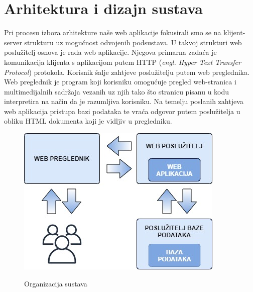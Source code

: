 \chapter{Arhitektura i dizajn sustava}
		

	\textnormal{Pri procesu izbora arhitekture naše web aplikacije fokusirali smo se na klijent-server strukturu uz mogućnost odvojenih podsustava. U takvoj strukturi web poslužitelj osnova je rada web aplikacije. Njegova primarna zadaća je komunikacija klijenta s aplikacijom putem HTTP (\textit{engl. Hyper Text Transfer Protocol}) protokola. Korisnik šalje zahtjeve poslužitelju putem web preglednika. Web preglednik je program koji korisniku omogućuje pregled web-stranica i multimedijalnih sadržaja vezanih uz njih tako što stranicu pisanu u kodu interpretira na način da je razumljiva korisniku. Na temelju poslanih zahtjeva web aplikacija pristupa bazi podataka te vraća odgovor putem poslužitelja u obliku HTML dokumenta koji je vidljiv u pregledniku.}

	\begin{figure}[H]
		\centering
		\includegraphics[scale=0.7]{slike/Arhitektura} \\
		\caption{ Organizacija sustava}
		\label{fig:arhitektura}
	\end{figure}

